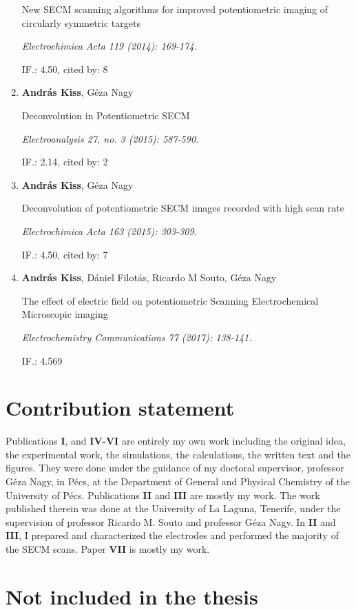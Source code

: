 \begin{enumerate}
New SECM scanning algorithms for improved potentiometric imaging of circularly symmetric targets 

\emph{Electrochimica Acta 119 (2014): 169-174.}

IF.: 4.50, cited by: 8

\item \textbf{András Kiss}, Géza Nagy

Deconvolution in Potentiometric SECM

\emph{Electroanalysis 27, no. 3 (2015): 587-590.}

IF.: 2.14, cited by: 2

\item \textbf{András Kiss}, Géza Nagy

Deconvolution of potentiometric SECM images recorded with high scan rate

\emph{Electrochimica Acta 163 (2015): 303-309.}

IF.: 4.50, cited by: 7

\item \textbf{András Kiss}, Dániel Filotás, Ricardo M Souto, Géza Nagy

The effect of electric field on potentiometric Scanning Electrochemical Microscopic imaging

\emph{Electrochemistry Communications 77 (2017): 138-141.}

IF.: 4.569

\end{enumerate}
\section*{Contribution statement}
Publications \textbf{I}, and \textbf{IV-VI} are entirely my own work including the original idea, the experimental work, the simulations, the calculations, the written text and the figures. They were done under the guidance of my doctoral supervisor, professor Géza Nagy, in Pécs, at the Department of General and Physical Chemistry of the University of Pécs.
Publications \textbf{II} and \textbf{III} are mostly my work.
The work published therein was done at the University of La Laguna, Tenerife, under the supervision of professor Ricardo M. Souto and professor Géza Nagy.
In \textbf{II} and \textbf{III}, I prepared and characterized the electrodes and performed the majority of the SECM scans. Paper \textbf{VII} is mostly my work.

\newpage
\section*{Not included in the thesis}


